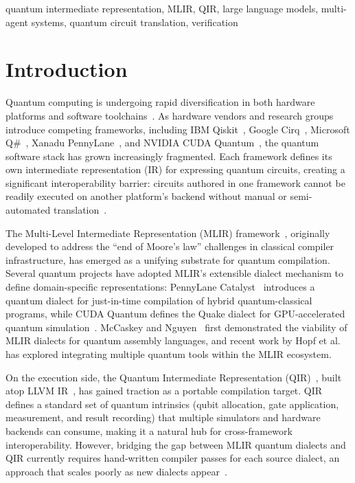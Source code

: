 \documentclass[conference]{IEEEtran}
\begin{document}
\begin{IEEEkeywords}
quantum intermediate representation, MLIR, QIR, large language models, multi-agent systems, quantum circuit translation, verification
\end{IEEEkeywords}

\section{Introduction}

Quantum computing is undergoing rapid diversification in both hardware platforms and software toolchains~\cite{preskill2018quantum, heim2020quantum}. As hardware vendors and research groups introduce competing frameworks, including IBM Qiskit~\cite{javadi2024qiskit}, Google Cirq~\cite{cirq2024}, Microsoft Q\#~\cite{svore2018qsharp}, Xanadu PennyLane~\cite{bergholm2022pennylane}, and NVIDIA CUDA Quantum~\cite{kim2023cudaquantum}, the quantum software stack has grown increasingly fragmented. Each framework defines its own intermediate representation (IR) for expressing quantum circuits, creating a significant interoperability barrier: circuits authored in one framework cannot be readily executed on another platform's backend without manual or semi-automated translation~\cite{cardama2025review}.

The Multi-Level Intermediate Representation (MLIR) framework~\cite{lattner2021mlir}, originally developed to address the ``end of Moore's law'' challenges in classical compiler infrastructure, has emerged as a unifying substrate for quantum compilation. Several quantum projects have adopted MLIR's extensible dialect mechanism to define domain-specific representations: PennyLane Catalyst~\cite{ittah2024catalyst} introduces a quantum dialect for just-in-time compilation of hybrid quantum-classical programs, while CUDA Quantum defines the Quake dialect for GPU-accelerated quantum simulation~\cite{kim2023cudaquantum}. McCaskey and Nguyen~\cite{mccaskey2021mlirdialect} first demonstrated the viability of MLIR dialects for quantum assembly languages, and recent work by Hopf et al.~\cite{hopf2026integrating} has explored integrating multiple quantum tools within the MLIR ecosystem.

On the execution side, the Quantum Intermediate Representation (QIR)~\cite{qirspec2021}, built atop LLVM IR~\cite{lattner2004llvm}, has gained traction as a portable compilation target. QIR defines a standard set of quantum intrinsics (qubit allocation, gate application, measurement, and result recording) that multiple simulators and hardware backends can consume, making it a natural hub for cross-framework interoperability. However, bridging the gap between MLIR quantum dialects and QIR currently requires hand-written compiler passes for each source dialect, an approach that scales poorly as new dialects appear~\cite{cardama2025review, hopf2026integrating}.
\end{document}
